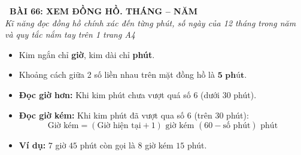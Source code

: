 \documentclass[11pt,a4paper]{article}
\begin{document}
\begin{tcolorbox}[
  enhanced,
  colback=white,
  colframe=primary,
  arc=3mm,
  boxrule=1.2pt,
  left=4mm, right=4mm, top=2.5mm, bottom=2.5mm,
  drop shadow=black!10!white
]
  \centering
  {\Large\bfseries\color{primary}\faBookmark\ BÀI 66: XEM ĐỒNG HỒ. THÁNG -- NĂM}\\[1.5mm]
  {\small\itshape\color{black!75}Kĩ năng đọc đồng hồ chính xác đến từng phút, số ngày của 12 tháng trong năm và quy tắc nắm tay trên 1 trang A4}
\end{tcolorbox}

\vspace{-2mm}


\noindent
\begin{minipage}[t]{0.49\textwidth}\vspace{0pt}
\begin{tcolorbox}[
  enhanced,
  colback=blue!4!white,
  colframe=blue!75!black,
  arc=2mm, boxrule=0.8pt,
  left=2mm, right=2mm, top=1.8mm, bottom=1.8mm,
  title={\footnotesize\bfseries\color{white}\faClockO\ 1. Kĩ năng xem đồng hồ chính xác}
]
{\footnotesize
\begin{itemize}\setlength{\itemsep}{1.5pt}\setlength{\leftskip}{-2.5mm}
  \item Kim ngắn chỉ \textbf{giờ}, kim dài chỉ \textbf{phút}.
  \item Khoảng cách giữa 2 số liền nhau trên mặt đồng hồ là $\mathbf{5\text{ phút}}$.
  \item \textbf{Đọc giờ hơn:} Khi kim phút chưa vượt quá số $6$ (dưới $30$ phút).
  \item \textbf{Đọc giờ kém:} Khi kim phút đã vượt qua số $6$ (trên $30$ phút):
  $$\text{Giờ kém} = (\text{Giờ hiện tại} + 1)\text{ giờ kém } (60 - \text{số phút})\text{ phút}$$
  \item \textbf{Ví dụ:} $7$ giờ $45$ phút còn gọi là $8$ giờ kém $15$ phút.
\end{itemize}
}
\end{tcolorbox}
\end{minipage}
\hfill
\end{document}
